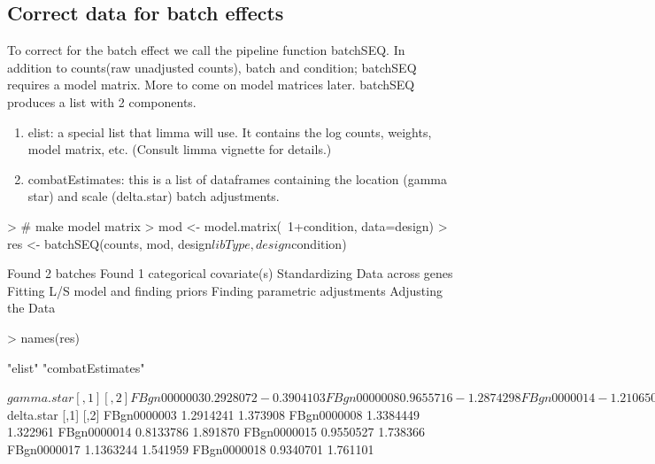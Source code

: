 \documentclass{article}
\begin{document}
\subsection{Correct data for batch effects}
To correct for the batch effect we call the pipeline function batchSEQ. In addition to 
counts(raw unadjusted counts), batch and condition; batchSEQ requires a model matrix.
More to come on model matrices later. batchSEQ produces a list with 2 components.
\begin{enumerate}
\item elist: a special list that limma will use. It contains the log counts, weights, model matrix, etc. (Consult limma vignette for details.)
\item combatEstimates: this is a list of dataframes containing the location (gamma star) and scale (delta.star) batch adjustments. 
\end{enumerate}
\begin{Schunk}
\begin{Sinput}
> # make model matrix
> mod <- model.matrix(~1+condition, data=design)
> res <- batchSEQ(counts, mod, design$libType, design$condition)
\end{Sinput}
\begin{Soutput}
Found 2 batches
Found 1  categorical covariate(s)
Standardizing Data across genes
Fitting L/S model and finding priors
Finding parametric adjustments
Adjusting the Data
\end{Soutput}
\begin{Sinput}
> names(res)
\end{Sinput}
\begin{Soutput}
[1] "elist"           "combatEstimates"
\end{Soutput}
\begin{Soutput}
$gamma.star
                  [,1]       [,2]
FBgn0000003  0.2928072 -0.3904103
FBgn0000008  0.9655716 -1.2874298
FBgn0000014 -1.2106506  1.6142024
FBgn0000015  0.3734137 -0.4978840
FBgn0000017  0.1147053 -0.1529403
FBgn0000018 -1.1245230  1.4993651

$delta.star
                 [,1]     [,2]
FBgn0000003 1.2914241 1.373908
FBgn0000008 1.3384449 1.322961
FBgn0000014 0.8133786 1.891870
FBgn0000015 0.9550527 1.738366
FBgn0000017 1.1363244 1.541959
FBgn0000018 0.9340701 1.761101
\end{Soutput}
\end{Schunk}
\end{document}
